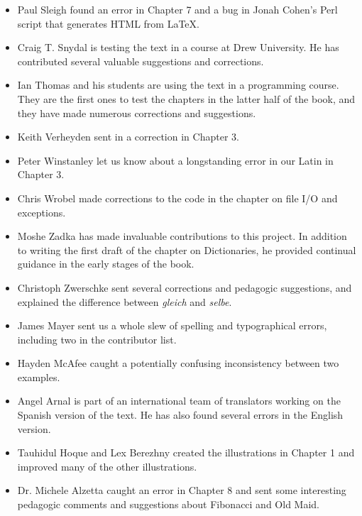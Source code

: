 \documentclass[10pt]{book}
\begin{document}
\begin{CJK}{UTF8}{gbsn}
\begin{itemize}
\item Paul Sleigh found an error in Chapter 7 and a bug in Jonah Cohen's
Perl script that generates HTML from LaTeX.

\item Craig T. Snydal is testing the text in a course at Drew
University.  He has contributed several valuable suggestions and corrections.

\item Ian Thomas and his students are using the text in a programming
course.  They are the first ones to test the chapters in the latter half
of the book, and they have made numerous corrections and suggestions.

\item Keith Verheyden sent in a correction in Chapter 3.

\item Peter Winstanley let us know about a longstanding error in
our Latin in Chapter 3.

\item Chris Wrobel made corrections to the code in the chapter on
file I/O and exceptions. 

\item Moshe Zadka has made invaluable contributions to this project.
In addition to writing the first draft of the chapter on Dictionaries, he
provided continual guidance in the early stages of the book.

\item Christoph Zwerschke sent several corrections and
pedagogic suggestions, and explained the difference between {\em gleich}
and {\em selbe}.

\item James Mayer sent us a whole slew of spelling and
typographical errors, including two in the contributor list.

\item Hayden McAfee caught a potentially confusing inconsistency
between two examples.

\item Angel Arnal is part of an international team of translators
working on the Spanish version of the text.  He has also found several
errors in the English version.

\item Tauhidul Hoque and Lex Berezhny created the illustrations
in Chapter 1 and improved many of the other illustrations.

\item Dr. Michele Alzetta caught an error in Chapter 8 and sent
some interesting pedagogic comments and suggestions about Fibonacci
and Old Maid.


\end{itemize}
\end{CJK}
\end{document}

